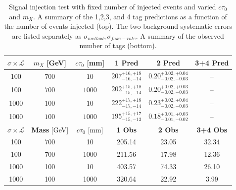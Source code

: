 \begin{table}
\caption{Signal injection test with fixed number of injected events and varied $c\tau_0$ and $m_X$. 
A summary of the 1,2,3, and 4 tag predictions as a function of the number of events injected (top). The two background systematic errors are
listed separately as $\sigma_{method},\sigma_{fake-rate}$.  A summary of the observed number of tags (bottom). 
\label{tab:700_100_injection_summary}}
\begin{center}
\begin{tabular}{cccccc}
\hline 
$\sigma\times\mathcal{L}$ & $m_X$ [GeV] & $c\tau_0$ [mm]  & \textbf{1 Pred} & \textbf{2 Pred} & \textbf{3+4 Pred} \\
\hline
100 &$ 700 $&$ 10 $&$ 207^{+16,+18}_{-16,-14} $&$0.20^{+0.02,+0.04}_{-0.02,-0.03} $&-- \\
100 &$ 700 $&$ 1000 $&$ 202^{+15,+18}_{-15,-14} $&$0.20^{+0.02,+0.03}_{-0.02,-0.03} $&--\\
1000 &$ 100 $&$ 10 $&$222^{+17,+18}_{-17,-14} $&$0.23^{+0.02,+0.04}_{-0.02,-0.03} $&--\\
1000 &$ 100 $&$ 1000 $&$ 195^{+15,+17}_{-15,-13} $&$0.18^{+0.01,+0.03}_{-0.01,-0.02} $&--\\ 
\hline 
\hline 
$\sigma\times\mathcal{L}$ & \textbf{Mass} [GeV] & $c\tau_0$ [mm]  & \textbf{1 Obs} & \textbf{2 Obs} & \textbf{3+4 Obs}  \\
\hline
100 & 700 & 10 & 205.14 & 23.05 & 32.34 \\
100 & 700 & 1000 & 211.56 & 17.98 & 12.36  \\
1000 & 100 & 10 & 403.57 & 74.33 & 26.10 \\
1000 & 100 & 1000 & 320.64 & 22.92 & 3.99  \\
\end{tabular} 
\end{center}
\end{table}

